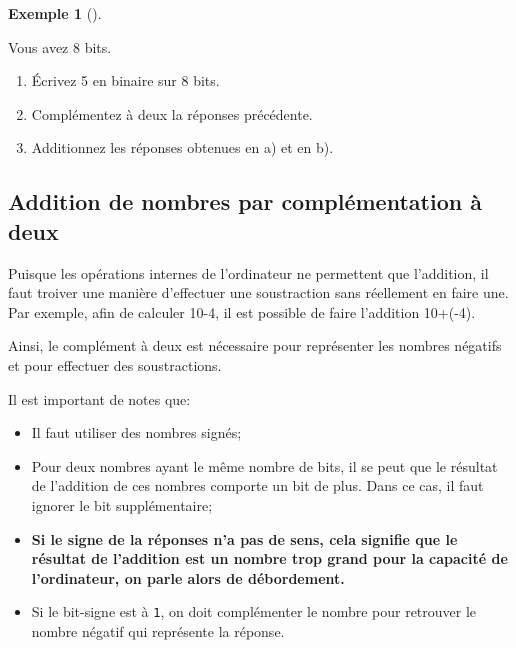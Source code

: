 \documentclass[
  letterpaper,
]{scrbook}
\providecommand{\tightlist}{%
  \setlength{\itemsep}{0pt}\setlength{\parskip}{0pt}}\usepackage{longtable,booktabs,array}
\theoremstyle{definition}
\newtheorem{example}{Exemple}[chapter]
\theoremstyle{definition}
\theoremstyle{plain}
\theoremstyle{remark}
\begin{document}
\leavevmode{}%
\begin{example}[]\label{exm-valeur-5-8-bits}

Vous avez 8 bits.

\begin{enumerate}
\def\labelenumi{\alph{enumi})}
\tightlist
\item
  Écrivez 5 en binaire sur 8 bits.
\item
  Complémentez à deux la réponses précédente.
\item
  Additionnez les réponses obtenues en a) et en b).
\end{enumerate}

\end{example}

\hypertarget{addition-de-nombres-par-compluxe9mentation-uxe0-deux}{%
\subsection{Addition de nombres par complémentation à
deux}\label{addition-de-nombres-par-compluxe9mentation-uxe0-deux}}

Puisque les opérations internes de l'ordinateur ne permettent que
l'addition, il faut troiver une manière d'effectuer une soustraction
sans réellement en faire une. Par exemple, afin de calculer 10-4, il est
possible de faire l'addition 10+(-4).

Ainsi, le complément à deux est nécessaire pour représenter les nombres
négatifs et pour effectuer des soustractions.

\begin{tcolorbox}[enhanced jigsaw, colframe=quarto-callout-important-color-frame, bottomtitle=1mm, coltitle=black, breakable, arc=.35mm, title=\textcolor{quarto-callout-important-color}{\faExclamation}\hspace{0.5em}{Important}, opacitybacktitle=0.6, colback=white, opacityback=0, colbacktitle=quarto-callout-important-color!10!white, leftrule=.75mm, rightrule=.15mm, titlerule=0mm, toprule=.15mm, toptitle=1mm, left=2mm, bottomrule=.15mm]

Il est important de notes que:

\begin{itemize}
\tightlist
\item
  Il faut utiliser des nombres signés;
\item
  Pour deux nombres ayant le même nombre de bits, il se peut que le
  résultat de l'addition de ces nombres comporte un bit de plus. Dans ce
  cas, il faut ignorer le bit supplémentaire;
\item
  \textbf{Si le signe de la réponses n'a pas de sens, cela signifie que
  le résultat de l'addition est un nombre trop grand pour la capacité de
  l'ordinateur, on parle alors de débordement.}
\item
  Si le bit-signe est à \texttt{1}, on doit complémenter le nombre pour
  retrouver le nombre négatif qui représente la réponse.
\end{itemize}

\end{tcolorbox}
\end{document}
